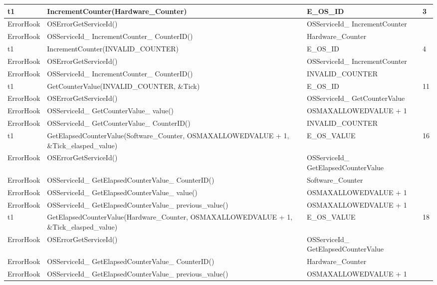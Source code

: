 \documentclass[10pt]{article}
\newlength{\Li}\settowidth{\Li}{Running}
\newlength{\Lii}\setlength{\Lii}{7cm}
\newlength{\Liiii}\setlength{\Liiii}{0.9cm}
\newlength{\Liii}\setlength{\Liii}{\textwidth} \addtolength{\Liii}{-\Li} \addtolength{\Liii}{-\Lii} \addtolength{\Liii}{-\Liiii}
\begin{document}
	\begin{supertabular}{|p{\Li}|p{\Lii}|p{\Liii}|p{\Liiii}|} \hline 
	t1		& IncrementCounter(Hardware\_Counter)													& E\_OS\_ID							& 3 \\ \hline
	ErrorHook	& OSErrorGetServiceId()																	& OSServiceId\_ IncrementCounter			& \\ \hline
	ErrorHook	& OSServiceId\_ IncrementCounter\_ CounterID()												& Hardware\_Counter					& \\ \hline
	
	t1		& IncrementCounter(INVALID\_COUNTER)													& E\_OS\_ID							& 4 \\ \hline
	ErrorHook	& OSErrorGetServiceId()																	& OSServiceId\_ IncrementCounter			& \\ \hline
	ErrorHook	& OSServiceId\_ IncrementCounter\_ CounterID()												& INVALID\_COUNTER					& \\ \hline
	
	t1		& GetCounterValue(INVALID\_COUNTER, \&Tick)												& E\_OS\_ID							& 11 \\ \hline
	ErrorHook	& OSErrorGetServiceId()																	& OSServiceId\_ GetCounterValue			& \\ \hline
	ErrorHook	& OSServiceId\_ GetCounterValue\_ value()													& OSMAXALLOWEDVALUE + 1			& \\ \hline	
	ErrorHook	& OSServiceId\_ GetCounterValue\_ CounterID()												& INVALID\_COUNTER					& \\ \hline
	
	t1		& GetElapsedCounterValue(Software\_Counter, OSMAXALLOWEDVALUE + 1, \&Tick\_elasped\_value)	& E\_OS\_VALUE						& 16 \\ \hline
	ErrorHook	& OSErrorGetServiceId()																	& OSServiceId\_ GetElapsedCounterValue	& \\ \hline
	ErrorHook	& OSServiceId\_ GetElapsedCounterValue\_ CounterID()										& Software\_Counter					& \\ \hline
	ErrorHook	& OSServiceId\_ GetElapsedCounterValue\_ value()											& OSMAXALLOWEDVALUE + 1			& \\ \hline
	ErrorHook	& OSServiceId\_ GetElapsedCounterValue\_ previous\_value()									& OSMAXALLOWEDVALUE + 1			& \\ \hline
	
	t1		& GetElapsedCounterValue(Hardware\_Counter, OSMAXALLOWEDVALUE + 1, \&Tick\_elasped\_value)	& E\_OS\_VALUE						& 18 \\ \hline
	ErrorHook	& OSErrorGetServiceId()																	& OSServiceId\_ GetElapsedCounterValue	& \\ \hline
	ErrorHook	& OSServiceId\_ GetElapsedCounterValue\_ CounterID()										& Hardware\_Counter					& \\ \hline
	ErrorHook	& OSServiceId\_ GetElapsedCounterValue\_ previous\_value()									& OSMAXALLOWEDVALUE + 1			& \\ \hline
	

\end{supertabular}
\end{document}
